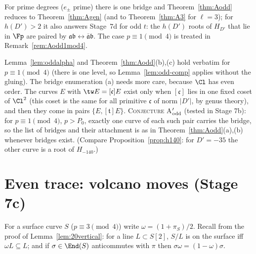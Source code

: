 \begin{remark}
For prime degrees ($e_\pm$ prime) there is one bridge and Theorem~\ref{thm:Aodd} reduces to Theorem~\ref{thm:Agen} (and to
Theorem~\ref{thm:A3} for $\ell=3$); for $h(D')>2$ it also answers Stage~7d for odd $t$: the $h(D')$ roots of $H_{D'}$ that lie in
$\Fp$ are paired by $\mathfrak a\mathfrak b\leftrightarrow\bar{\mathfrak a}\mathfrak b$.  The case $p\equiv1\pmod4$ is treated in
Remark~\ref{rem:Aodd1mod4}.
\end{remark}

\begin{remark}\label{rem:Aodd1mod4}
Lemma~\ref{lem:oddalpha} and Theorem~\ref{thm:Aodd}(b),(c) hold verbatim for $p\equiv1\pmod4$ (there is one level, so
Lemma~\ref{lem:odd-comp} applies without the gluing).  The bridge enumeration (a) needs more care, because $\Cl$ has even order.
The curves $E$ with $\tw E=[\mathfrak c]E$ exist only when $[\mathfrak c]$ lies in one fixed coset of $\Cl^2$ (this coset is the same
for all primitive $\mathfrak c$ of norm $|D'|$, by genus theory), and then they come in pairs $\{E,[\mathfrak t]E\}$.
\textsc{Conjecture A$_{\rm odd}'$} (tested in Stage 7b): for $p\equiv1\pmod4$, $p>P_0$, exactly one curve of each such pair carries the
bridge, so the list of bridges and their attachment is as in Theorem~\ref{thm:Aodd}(a),(b) whenever bridges exist.  (Compare
Proposition~\ref{prop:h140}: for $D'=-35$ the other curve is a root of $H_{-140}$.)
\end{remark}

\section{Even trace: volcano moves (Stage 7c)}\label{sec:7c}

For a surface curve $S$ ($p\equiv3\pmod4$) write $\omega=(1+\pi_S)/2$.  Recall from the proof of Lemma~\ref{lem:20vertical}:
for a line $L\subset S[2]$, $S/L$ is on the surface iff $\omega L\subseteq L$; and if $\sigma\in\End(S)$ anticommutes with $\pi$
then $\sigma\omega=(1-\omega)\sigma$.

